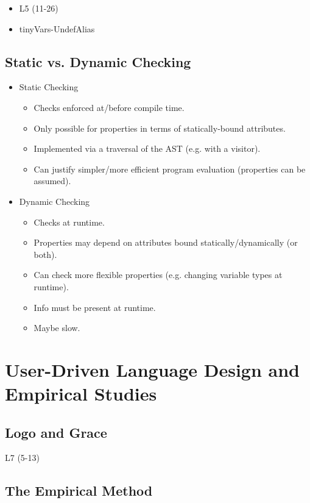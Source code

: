 \documentclass{article}
\begin{document}
\begin{itemize}
    \item L5 (11-26)
    \item tinyVars-UndefAlias
\end{itemize}

\subsection{Static vs. Dynamic Checking}

\begin{itemize}
    \item Static Checking
    \begin{itemize}
        \item Checks enforced at/before compile time.
        \item Only possible for properties in terms of statically-bound attributes.
        \item Implemented via a traversal of the AST (e.g. with a visitor).
        \item Can justify simpler/more efficient program evaluation (properties can be assumed).
    \end{itemize}
    \item Dynamic Checking
    \begin{itemize}
        \item Checks at runtime.
        \item Properties may depend on attributes bound statically/dynamically (or both).
        \item Can check more flexible properties (e.g. changing variable types at runtime).
        \item Info must be present at runtime.
        \item Maybe slow.
    \end{itemize}
\end{itemize}

\section{User-Driven Language Design and Empirical Studies}

\subsection{Logo and Grace}

L7 (5-13)

\subsection{The Empirical Method}
\end{document}
